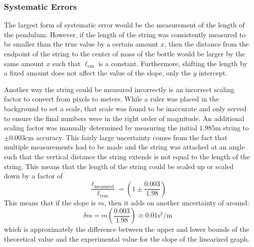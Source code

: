 \documentclass[%
 reprint,
 amsmath,amssymb
 aps,
]{revtex4-2}
\begin{document}
\subsubsection{Systematic Errors}
The largest form of systematic error would be the measurement of the length of the pendulum. However, if the length of the string was consistently measured to be smaller than the true value by a certain amount $x$, then the distance from the endpoint of the string to the center of mass of the bottle would be larger by the same amount $x$ such that $\ell_\text{cm}$ is a constant. Furthermore, shifting the length by a fixed amount does not affect the value of the slope, only the $y$ intercept.

Another way the string could be measured incorrectly is an incorrect scaling factor to convert from pixels to meters. While a ruler was placed in the background to set a scale, that scale was found to be inaccurate and only served to ensure the final numbers were in the right order of magnitude. An additional scaling factor was manually determined by measuring the initial $1.985\si{\meter}$ string to $\pm 0.003\si{\centi\meter}$ accuracy. This fairly large uncertainty comes from the fact that multiple measurements had to be made and the string was attached at an angle such that the vertical distance the string extends is not equal to the length of the string. This means that the length of the string could be scaled up or scaled down by a factor of 
\begin{equation}
    \frac{\ell_\text{measured}}{\ell_\text{true}} = \left(1 \pm \frac{0.003}{1.98}\right)
    \label{eq:}
\end{equation}
This means that if the slope is $m$, then it adds on another uncertainty of around:
\begin{equation}
    \delta m = m\left(\frac{0.003}{1.98}\right) \approx 0.01 \si{\second\squared\per\meter}
    \label{eq:}
\end{equation}
which is approximately the difference between the upper and lower bounds of the theoretical value and the experimental value for the slope of the linearized graph.
\end{document}
